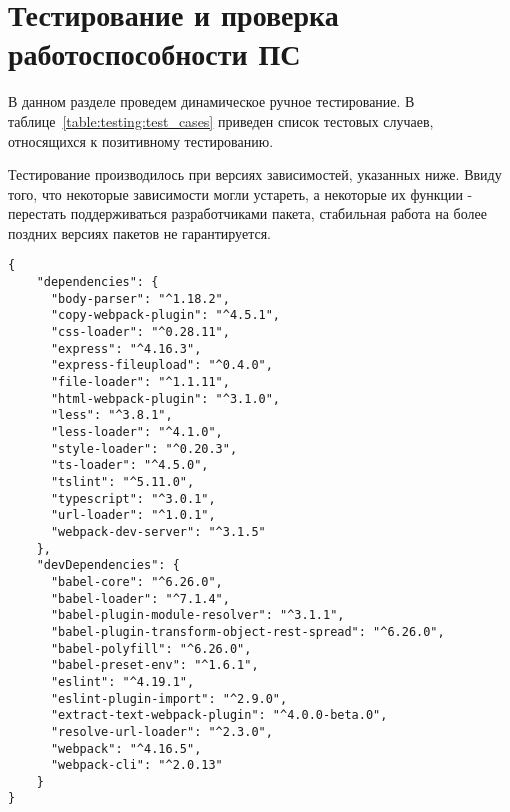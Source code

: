 \section{Тестирование и проверка работоспособности ПС}
\label{sec:testing}

В данном разделе проведем динамическое ручное тестирование. В таблице~\ref{table:testing:test_cases} приведен список тестовых случаев, относящихся к позитивному тестированию.

Тестирование производилось при версиях зависимостей, указанных ниже. Ввиду того, что некоторые зависимости могли устареть, а некоторые их функции - перестать поддерживаться разработчиками пакета, стабильная работа на более поздних версиях пакетов не гарантируется.

\begin{lstlisting}
{
	"dependencies": {
      "body-parser": "^1.18.2",
      "copy-webpack-plugin": "^4.5.1",
      "css-loader": "^0.28.11",
      "express": "^4.16.3",
      "express-fileupload": "^0.4.0",
      "file-loader": "^1.1.11",
      "html-webpack-plugin": "^3.1.0",
      "less": "^3.8.1",
      "less-loader": "^4.1.0",
      "style-loader": "^0.20.3",
      "ts-loader": "^4.5.0",
      "tslint": "^5.11.0",
      "typescript": "^3.0.1",
      "url-loader": "^1.0.1",
      "webpack-dev-server": "^3.1.5"
	},
	"devDependencies": {
      "babel-core": "^6.26.0",
      "babel-loader": "^7.1.4",
      "babel-plugin-module-resolver": "^3.1.1",
      "babel-plugin-transform-object-rest-spread": "^6.26.0",
      "babel-polyfill": "^6.26.0",
      "babel-preset-env": "^1.6.1",
      "eslint": "^4.19.1",
      "eslint-plugin-import": "^2.9.0",
      "extract-text-webpack-plugin": "^4.0.0-beta.0",
      "resolve-url-loader": "^2.3.0",
      "webpack": "^4.16.5",
      "webpack-cli": "^2.0.13"
	}
}
\end{lstlisting}

\newcommand\testnumber{\stepcounter{testnumber}\arabic{testnumber}}

\renewcommand{\labelenumi}{\arabic{enumi})}
\renewcommand{\labelenumii}{\asbuk{enumii})}

